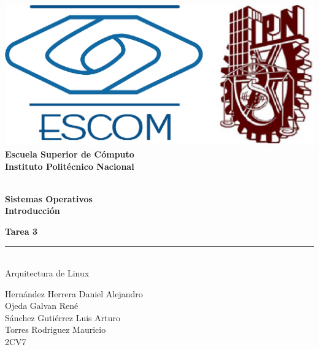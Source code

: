 
\begin{titlepage} %

    \begin{flushright}

	   \includegraphics[scale=0.15]{imagenes/escom-ipn.png}
	   \large \textbf{\\Escuela Superior de C\'omputo}
	   \large \textbf{\\Instituto Polit\'ecnico Nacional }%

	   \vspace{2.5cm} %

	   \large \textbf{\\Sistemas Operativos}%
	   \large \textbf{\\Introducción}%

	   \vspace{1.2cm} %

	   \large \textbf{Tarea 3}\\%
	   \rule{5cm}{3pt} %
	   \large{\\ Arquitectura de Linux} %

	   \vspace{2.5cm} %

	   
	   Hernández Herrera Daniel Alejandro \\ %
	   Ojeda Galvan René \\ 
	   Sánchez Gutiérrez Luis Arturo \\ 
	   Torres Rodriguez Mauricio \\ 
	   2CV7 %

	   \vspace{2.5cm} %

	   \date{\today}

    \end{flushright}

\end{titlepage}
